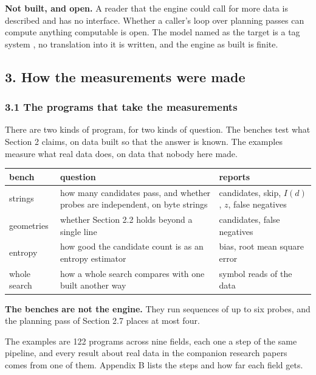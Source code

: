 \noindent\textbf{Not built, and open.} A reader that the engine could call for more data is described and has no interface. Whether a caller's loop over planning passes can compute anything computable is open. The model named as the target is a tag system \cite{src:Post, src:Minsky}, no translation into it is written, and the engine as built is finite.

\subsection{3. How the measurements were made}

\subsubsection{3.1 The programs that take the measurements}

There are two kinds of program, for two kinds of question. The benches test what Section 2
claims, on data built so that the answer is known. The examples measure what real data does, on
data that nobody here made.

\begin{center}
\begin{tabular}{@{}>{\raggedright\arraybackslash}p{}>{\raggedright\arraybackslash}p{}>{\raggedright\arraybackslash}p{}@{}}
\toprule
bench & question & reports \\
\midrule
strings &
  how many candidates pass, and whether probes are independent, on byte strings &
  candidates, skip, \(I(d)\), \(z\), false negatives \\
\addlinespace[0.4em]
geometries &
  whether Section 2.2 holds beyond a single line &
  candidates, false negatives \\
\addlinespace[0.4em]
entropy &
  how good the candidate count is as an entropy estimator &
  bias, root mean square error \\
\addlinespace[0.4em]
whole search &
  how a whole search compares with one built another way &
  symbol reads of the data \\
\bottomrule
\end{tabular}
\end{center}

\noindent\textbf{The benches are not the engine.} They run sequences of up to six probes, and the planning pass of Section 2.7 places at most four.

The examples are 122 programs across nine fields, each one a step of the same pipeline, and every result about real data in the companion research papers comes from one of them. Appendix B lists the steps and how far each field gets.

